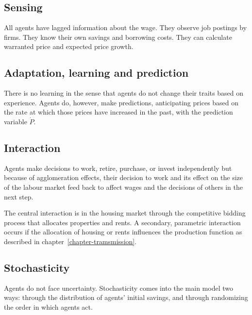 \subsection{Sensing}
All agents have lagged information about the wage. They observe job postings by firms. They know their own savings and borrowing costs. They can calculate  warranted price and expected price growth.%



\subsection{Adaptation, learning and prediction}
There is no learning in the sense that agents do not change their traits based on experience. Agents do, however, make predictions, anticipating prices based on the rate at which those prices have increased in the past, with the prediction variable $\dot P$.

\subsection{Interaction}
Agents make decisions to work, retire,  purchase, or invest independently but because of agglomeration effects, their decision to work and its effect on the size of the labour market feed back to affect wages and the decisions of others in the next step. 

The central interaction is in the housing market through the competitive bidding process that allocates properties and rents.  A secondary, parametric interaction occurs if the allocation of housing or rents influences the production function as described in chapter~\ref{chapter-tramsmission}.

\subsection{Stochasticity}
Agents do not face uncertainty. Stochasticity comes into the main model two ways: through the distribution of agents' initial savings, and through randomizing the order in which agents act. 


